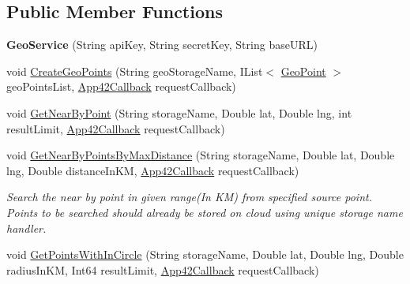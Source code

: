 \subsection*{Public Member Functions}
\begin{DoxyCompactItemize}
\item 
\hypertarget{classcom_1_1shephertz_1_1app42_1_1paas_1_1sdk_1_1windows_1_1geo_1_1_geo_service_aa32da9c2080a347605cd7b306624e28a}{{\bfseries Geo\+Service} (String api\+Key, String secret\+Key, String base\+U\+R\+L)}\label{classcom_1_1shephertz_1_1app42_1_1paas_1_1sdk_1_1windows_1_1geo_1_1_geo_service_aa32da9c2080a347605cd7b306624e28a}

\item 
void \hyperlink{classcom_1_1shephertz_1_1app42_1_1paas_1_1sdk_1_1windows_1_1geo_1_1_geo_service_a5724888a7ed0687c7fb380378a7e2dd5}{Create\+Geo\+Points} (String geo\+Storage\+Name, I\+List$<$ \hyperlink{classcom_1_1shephertz_1_1app42_1_1paas_1_1sdk_1_1windows_1_1geo_1_1_geo_point}{Geo\+Point} $>$ geo\+Points\+List, \hyperlink{interfacecom_1_1shephertz_1_1app42_1_1paas_1_1sdk_1_1windows_1_1_app42_callback}{App42\+Callback} request\+Callback)
\item 
void \hyperlink{classcom_1_1shephertz_1_1app42_1_1paas_1_1sdk_1_1windows_1_1geo_1_1_geo_service_abefd3eaf0c75b71d2bb43839539844e9}{Get\+Near\+By\+Point} (String storage\+Name, Double lat, Double lng, int result\+Limit, \hyperlink{interfacecom_1_1shephertz_1_1app42_1_1paas_1_1sdk_1_1windows_1_1_app42_callback}{App42\+Callback} request\+Callback)
\item 
void \hyperlink{classcom_1_1shephertz_1_1app42_1_1paas_1_1sdk_1_1windows_1_1geo_1_1_geo_service_a1ca56b450c407ece3c087c36a3e34028}{Get\+Near\+By\+Points\+By\+Max\+Distance} (String storage\+Name, Double lat, Double lng, Double distance\+In\+K\+M, \hyperlink{interfacecom_1_1shephertz_1_1app42_1_1paas_1_1sdk_1_1windows_1_1_app42_callback}{App42\+Callback} request\+Callback)
\begin{DoxyCompactList}\small\item\em Search the near by point in given range(\+In K\+M) from specified source point. Points to be searched should already be stored on cloud using unique storage name handler. \end{DoxyCompactList}\item 
void \hyperlink{classcom_1_1shephertz_1_1app42_1_1paas_1_1sdk_1_1windows_1_1geo_1_1_geo_service_a28299c04d5c2f36767219acf890824d5}{Get\+Points\+With\+In\+Circle} (String storage\+Name, Double lat, Double lng, Double radius\+In\+K\+M, Int64 result\+Limit, \hyperlink{interfacecom_1_1shephertz_1_1app42_1_1paas_1_1sdk_1_1windows_1_1_app42_callback}{App42\+Callback} request\+Callback)

\end{DoxyCompactItemize}
